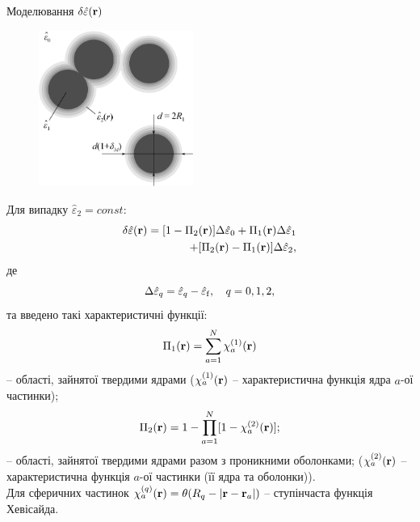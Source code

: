 \documentclass[10pt]{beamer}
\begin{document}
\begin{frame}{Моделювання $\delta\hat{\varepsilon}({\bf r})$}
\footnotesize

\begin{figure}
\vspace{-25pt}
  \begin{center}
    \includegraphics[width=0.45\textwidth]{images/Fig1_Microstructure_new5.eps}
  \end{center}
\vspace{-15pt}
\end{figure}

Для випадку $\hat{\varepsilon}_2 = const$:
\begin{equation}
\begin{split}
    \delta\hat{\varepsilon}({\bf r}) = [1 - \Pi_2({\bf r})]\Delta\hat{\varepsilon}_0 + \Pi_1({\bf r}) \Delta\hat{\varepsilon}_1 \\
    + [\Pi_2({\bf r}) - \Pi_1({\bf r})]\Delta\hat{\varepsilon}_2,
\end{split}
\end{equation}
де
$$
    \Delta\hat{\varepsilon}_q = \hat{\varepsilon}_{q} - \hat{\varepsilon}_{\rm f}, \quad q=0,1,2,
$$ та введено такі характеристичні функції: 
$$
    \Pi_1 ({\bf r}) = \sum\limits_{a=1}^N \chi_a^{(1)} ({\bf r})
$$
-- області, зайнятої твердими ядрами ($\chi_a^{(1)}({\bf r})$ -- характеристична функція ядра $a$-ої частинки);
$$
    \Pi_2 ({\bf r}) = 1 - \prod\limits_{a=1}^N [1 - \chi_a^{(2)} ({\bf r})];
$$
-- області, зайнятої твердими ядрами разом з проникними оболонками;
($\chi_a^{(2)}({\bf r})$ -- характеристична функція $a$-ої частинки (її ядра та оболонки)).\vspace{5pt}\\

Для сферичних частинок $\chi_a^{(q)}({\bf r}) = \theta(R_q - |{\bf r} - {\bf r}_a|)$ -- ступінчаста функція Хевісайда.

\end{frame}
\end{document}
